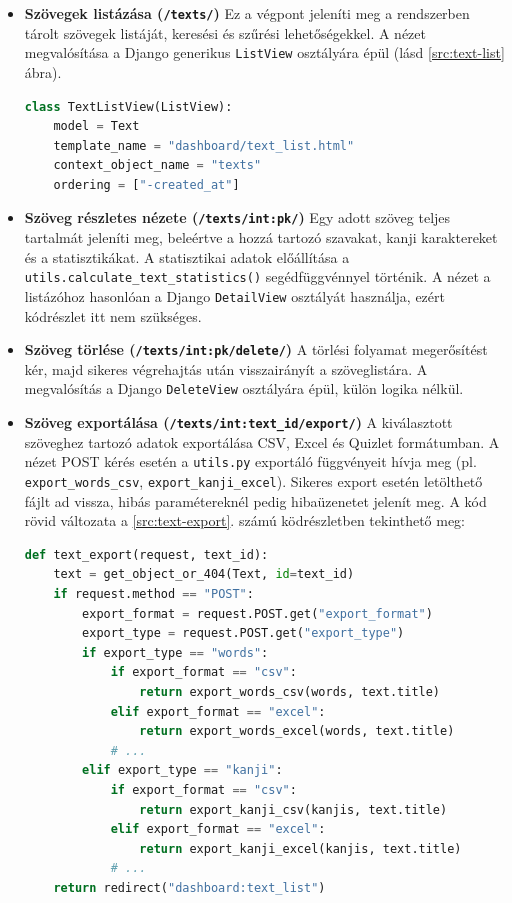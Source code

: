 \begin{itemize}
  \item \textbf{Szövegek listázása (\texttt{/texts/})}
  Ez a végpont jeleníti meg a rendszerben tárolt szövegek listáját, keresési és szűrési lehetőségekkel. A nézet megvalósítása a Django generikus \texttt{ListView} osztályára épül (lásd \ref{src:text-list} ábra).

\begin{lstlisting}[language={Python}]
class TextListView(ListView):
    model = Text
    template_name = "dashboard/text_list.html"
    context_object_name = "texts"
    ordering = ["-created_at"]
\end{lstlisting}

  \item \textbf{Szöveg részletes nézete (\texttt{/texts/int:pk/})}
  Egy adott szöveg teljes tartalmát jeleníti meg, beleértve a hozzá tartozó szavakat, kanji karaktereket és a statisztikákat. A statisztikai adatok előállítása a \texttt{utils.calculate\_text\_statistics()} segédfüggvénnyel történik. A nézet a listázóhoz hasonlóan a Django \texttt{DetailView} osztályát használja, ezért kódrészlet itt nem szükséges.

  \item \textbf{Szöveg törlése (\texttt{/texts/int:pk/delete/})}
  A törlési folyamat megerősítést kér, majd sikeres végrehajtás után visszairányít a szöveglistára. A megvalósítás a Django \texttt{DeleteView} osztályára épül, külön logika nélkül.

  \item \textbf{Szöveg exportálása (\texttt{/texts/int:text\_id/export/})}
  A kiválasztott szöveghez tartozó adatok exportálása CSV, Excel és Quizlet formátumban. A nézet POST kérés esetén a \texttt{utils.py} exportáló függvényeit hívja meg (pl. \texttt{export\_words\_csv}, \texttt{export\_kanji\_excel}). Sikeres export esetén letölthető fájlt ad vissza, hibás paramétereknél pedig hibaüzenetet jelenít meg. A kód rövid változata a \ref{src:text-export}. számú ködrészletben tekinthető meg:

\begin{lstlisting}[language={Python}]
def text_export(request, text_id):
    text = get_object_or_404(Text, id=text_id)
    if request.method == "POST":
        export_format = request.POST.get("export_format")
        export_type = request.POST.get("export_type")
        if export_type == "words":
            if export_format == "csv":
                return export_words_csv(words, text.title)
            elif export_format == "excel":
                return export_words_excel(words, text.title)
            # ...
        elif export_type == "kanji":
            if export_format == "csv":
                return export_kanji_csv(kanjis, text.title)
            elif export_format == "excel":
                return export_kanji_excel(kanjis, text.title)
            # ...
    return redirect("dashboard:text_list")
\end{lstlisting}


\end{itemize}
